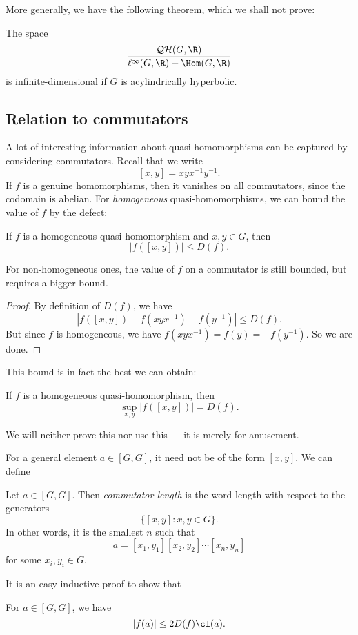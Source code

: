 \documentclass[a4paper]{article}
\newcommand\QH{\mathcal{QH}}
\begin{document}
More generally, we have the following theorem, which we shall not prove:
\begin{thm}
  The space
  \[
    \frac{\QH(G, \R)}{\ell^\infty(G, \R) + \Hom(G, \R)}
  \]
  is infinite-dimensional if $G$ is acylindrically hyperbolic.
\end{thm}

\subsection{Relation to commutators}
A lot of interesting information about quasi-homomorphisms can be captured by considering commutators. Recall that we write
\[
  [x, y] = xyx^{-1}y^{-1}.
\]
If $f$ is a genuine homomorphisms, then it vanishes on all commutators, since the codomain is abelian. For \emph{homogeneous} quasi-homomorphisms, we can bound the value of $f$ by the defect:
\begin{lemma}
  If $f$ is a homogeneous quasi-homomorphism and $x, y \in G$, then
  \[
    |f([x, y])| \leq D(f).
  \]
\end{lemma}
For non-homogeneous ones, the value of $f$ on a commutator is still bounded, but requires a bigger bound.

\begin{proof}
  By definition of $D(f)$, we have
  \[
    |f([x, y]) - f(xyx^{-1}) - f(y^{-1})| \leq D(f).
  \]
  But since $f$ is homogeneous, we have $f(xyx^{-1}) = f(y) = - f(y^{-1})$. So we are done.
\end{proof}

This bound is in fact the best we can obtain:
\begin{lemma}[Bavard, 1992]
  If $f$ is a homogeneous quasi-homomorphism, then
  \[
    \sup_{x, y} |f([x, y])| = D(f).
  \]
\end{lemma}
We will neither prove this nor use this --- it is merely for amusement.

For a general element $a \in [G, G]$, it need not be of the form $[x, y]$. We can define
\begin{defi}
  Let $a \in [G, G]$. Then \emph{commutator length}  is the word length with respect to the generators
  \[
    \{[x, y] : x, y \in G\}.
  \]
  In other words, it is the smallest $n$ such that
  \[
    a = [x_1, y_1][x_2, y_2] \cdots [x_n, y_n]
  \]
  for some $x_i, y_i \in G$.
\end{defi}

It is an easy inductive proof to show that
\begin{lemma}
  For $a \in [G, G]$, we have
  \[
    |f(a)| \leq 2D(f) \cl(a).
  \]
\end{lemma}
\end{document}
